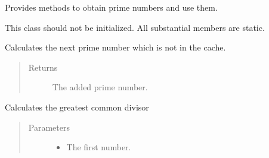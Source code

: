 \documentclass[letterpaper,10pt,english]{sphinxmanual}
\begin{document}
\begin{fulllineitems}
\label{\detokenize{prime:prime.Prime}}
Provides methods to obtain prime numbers and use them.

\begin{fulllineitems}
\label{\detokenize{prime:prime.Prime.__init__}}
This class should not be initialized. All substantial members are static.

\end{fulllineitems}


\begin{fulllineitems}
\label{\detokenize{prime:prime.Prime.append_next_to_cache}}
Calculates the next prime number which is not in the cache.
\begin{quote}\begin{description}
\item[{Returns}] \leavevmode
The added prime number.

\end{description}\end{quote}

\end{fulllineitems}


\begin{fulllineitems}
\label{\detokenize{prime:prime.Prime.cache}}
\end{fulllineitems}


\begin{fulllineitems}
\label{\detokenize{prime:prime.Prime.get_greatest_common_divisor}}
Calculates the greatest common divisor
\begin{quote}\begin{description}
\item[{Parameters}] \leavevmode\begin{itemize}
\item {} 
 \textendash{} The first number.


\end{itemize}
\end{description}
\end{quote}
\end{fulllineitems}
\end{fulllineitems}
\end{document}
